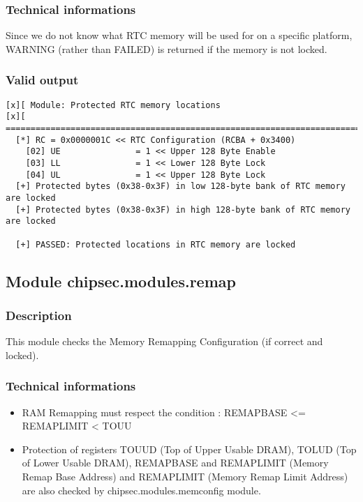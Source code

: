 \hypertarget{technical-informations-8}{%
\subsubsection{Technical informations}\label{technical-informations-8}}

Since we do not know what RTC memory will be used for on a specific
platform, WARNING (rather than FAILED) is returned if the memory is not
locked.

\hypertarget{valid-output-9}{%
\subsubsection{Valid output}\label{valid-output-9}}

\begin{verbatim}
[x][ Module: Protected RTC memory locations
[x][ =======================================================================
  [*] RC = 0x0000001C << RTC Configuration (RCBA + 0x3400)
    [02] UE               = 1 << Upper 128 Byte Enable 
    [03] LL               = 1 << Lower 128 Byte Lock 
    [04] UL               = 1 << Upper 128 Byte Lock 
  [+] Protected bytes (0x38-0x3F) in low 128-byte bank of RTC memory are locked
  [+] Protected bytes (0x38-0x3F) in high 128-byte bank of RTC memory are locked

  [+] PASSED: Protected locations in RTC memory are locked
\end{verbatim}

\hypertarget{module-chipsec.modules.remap}{%
\subsection{Module
chipsec.modules.remap}\label{module-chipsec.modules.remap}}

\hypertarget{description-10}{%
\subsubsection{Description}\label{description-10}}

This module checks the Memory Remapping Configuration (if correct and
locked).

\hypertarget{technical-informations-9}{%
\subsubsection{Technical informations}\label{technical-informations-9}}

\begin{itemize}
\tightlist
\item
  RAM Remapping must respect the condition : REMAPBASE \textless=
  REMAPLIMIT \textless{} TOUU
\item
  Protection of registers TOUUD (Top of Upper Usable DRAM), TOLUD (Top
  of Lower Usable DRAM), REMAPBASE and REMAPLIMIT (Memory Remap Base
  Address) and REMAPLIMIT (Memory Remap Limit Address) are also checked
  by chipsec.modules.memconfig module.
\end{itemize}

